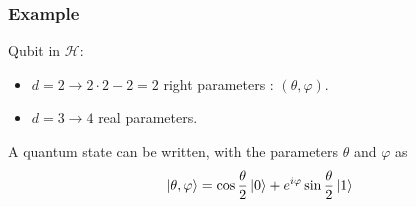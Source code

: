 \documentclass{article}
\begin{document}
\subsubsection*{Example}
Qubit in $\mathscr{H}$:
\begin{itemize}[label=-]
    \item $d=2 \rightarrow 2\cdot2-2 = 2$ right parameters : $(\theta, \varphi)$.
    \item $d=3 \rightarrow 4$ real parameters.
\end{itemize}
A quantum state can be written, with the parameters $\theta$ and $\varphi$ as
\begin{equation}
    \ket{\theta, \varphi} = \cos \frac{\theta}{2}\ket{0} + e^{i\varphi}\sin \frac{\theta}{2}\ket{1}
\end{equation}
\end{document}
